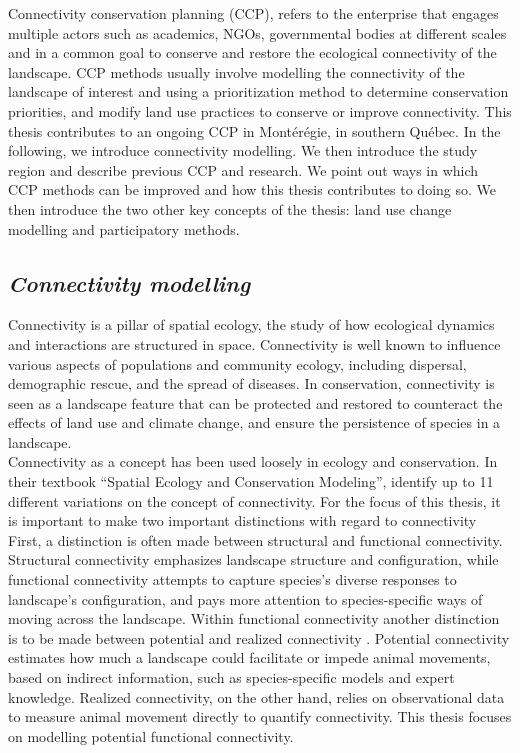 \documentclass[12pt,Bold,TexShade]{thesis/mcgilletdclass}
\begin{document}
{Connectivity conservation planning (CCP), refers to the enterprise that engages multiple actors such as academics, NGOs, governmental bodies at different scales and in a common goal to conserve and restore the ecological connectivity of the landscape. CCP methods usually involve modelling the connectivity of the landscape of interest and using a prioritization method to determine conservation priorities, and modify land use practices to conserve or improve connectivity. This thesis  contributes to an ongoing CCP in Montérégie, in southern Québec. In the following, we introduce connectivity modelling. We then introduce the study region and describe previous CCP and research. We point out ways in which CCP methods can be improved and how this thesis contributes to doing so. We then introduce the two other key concepts of the thesis: land use change modelling and participatory methods. \\ \vspace{2em}

\subsection*{\textit{Connectivity modelling \\ \vspace{1em}}}

Connectivity is a pillar of spatial ecology, the study of how ecological dynamics and interactions are structured in space. Connectivity is well known to influence various aspects of populations and community ecology, including dispersal, demographic rescue, and the spread of diseases. In conservation, connectivity is seen as a landscape feature that can be protected and restored to counteract the effects of  land use and climate change, and ensure the persistence of species in a landscape. \\

Connectivity as a concept has been used loosely in ecology and conservation. In their textbook “Spatial Ecology and Conservation Modeling”, \cite{fletcher_spatial_2018} identify up to 11 different variations on the concept of connectivity. For the focus of this thesis, it is important to make two important distinctions with regard to connectivity First, a distinction is often made between structural and functional connectivity. Structural connectivity emphasizes landscape structure and configuration, while functional connectivity attempts to capture species’s diverse responses to landscape’s configuration, and pays more attention to species-specific ways of moving across the landscape. Within functional connectivity another distinction is to be made between potential and realized connectivity \citep{calabrese_comparison_2004}. Potential connectivity estimates how much a landscape could facilitate or impede animal movements, based on indirect information, such as species-specific models and expert knowledge. Realized connectivity, on the other hand, relies on observational data to measure animal movement directly to quantify connectivity. This thesis focuses on modelling potential functional connectivity. \\

}
\end{document}
